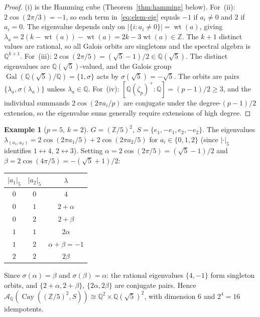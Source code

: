 \documentclass[12pt]{amsart}
\numberwithin{equation}{section}
\theoremstyle{plain}
\theoremstyle{definition}
\newtheorem{example}[theorem]{Example}
\DeclareMathOperator{\Gal}{Gal}
\DeclareMathOperator{\wt}{wt}
\DeclareMathOperator{\Cay}{Cay}
\newcommand{\Z}{\mathbb{Z}}
\newcommand{\Q}{\mathbb{Q}}
\newcommand{\calA}{\mathcal{A}}
\begin{document}
\begin{proof}
(i) is the Hamming cube (Theorem~\ref{thm:hamming} below).  For~(ii):
$2\cos(2\pi/3) = -1$, so each term in~\eqref{eq:elem-eig} equals $-1$
if $a_i \ne 0$ and $2$ if $a_i = 0$.  The eigenvalue depends only on
$|\{i : a_i \ne 0\}| = \wt(a)$, giving $\lambda_a = 2(k-\wt(a)) - \wt(a)
= 2k - 3\wt(a) \in \Z$.  The $k+1$ distinct values are rational, so all
Galois orbits are singletons and the spectral algebra is $\Q^{k+1}$.
For~(iii): $2\cos(2\pi/5) = (\sqrt{5}-1)/2 \in \Q(\sqrt{5})$.
The distinct eigenvalues are $\Q(\sqrt{5})$-valued, and the Galois group
$\Gal(\Q(\sqrt{5})/\Q) = \{1, \sigma\}$ acts by $\sigma(\sqrt{5}) = -\sqrt{5}$.
The orbits are pairs $\{\lambda_a, \sigma(\lambda_a)\}$ unless
$\lambda_a \in \Q$.  For~(iv): $[\Q(\zeta_p)^+:\Q] = (p-1)/2 \ge 3$,
and the individual summands $2\cos(2\pi a_i/p)$ are conjugate under the
degree-$(p-1)/2$ extension, so the eigenvalue sums generally require
extensions of high degree.
\end{proof}

\begin{example}[$p = 5$, $k = 2$]
\label{ex:elem-p5}
$G = (\Z/5)^2$, $S = \{e_1, -e_1, e_2, -e_2\}$.  The eigenvalues
$\lambda_{(a_1,a_2)} = 2\cos(2\pi a_1/5) + 2\cos(2\pi a_2/5)$ for
$a_i \in \{0,1,2\}$ (since $|\cdot|_5$ identifies $1 \leftrightarrow 4$,
$2 \leftrightarrow 3$).  Setting $\alpha = 2\cos(2\pi/5) = (\sqrt{5}-1)/2$
and $\beta = 2\cos(4\pi/5) = -(\sqrt{5}+1)/2$:
\begin{center}
\renewcommand{\arraystretch}{1.15}
\begin{tabular}{cc|c}
\toprule
$|a_1|_5$ & $|a_2|_5$ & $\lambda$ \\
\midrule
$0$ & $0$ & $4$ \\
$0$ & $1$ & $2+\alpha$ \\
$0$ & $2$ & $2+\beta$ \\
$1$ & $1$ & $2\alpha$ \\
$1$ & $2$ & $\alpha+\beta = -1$ \\
$2$ & $2$ & $2\beta$ \\
\bottomrule
\end{tabular}
\end{center}
Since $\sigma(\alpha) = \beta$ and $\sigma(\beta) = \alpha$:
the rational eigenvalues $\{4, -1\}$ form singleton orbits, and
$\{2+\alpha, 2+\beta\}$, $\{2\alpha, 2\beta\}$ are conjugate pairs.
Hence $\calA_\Q(\Cay((\Z/5)^2,S)) \cong \Q^2 \times \Q(\sqrt{5})^2$,
with dimension $6$ and $2^4 = 16$ idempotents.
\end{example}
\end{document}
